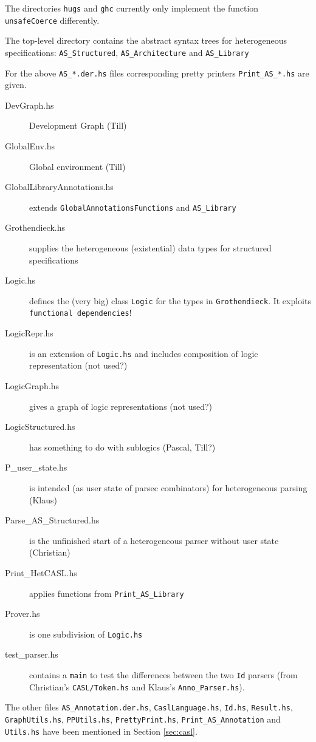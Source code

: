 \documentclass{article}
\begin{document}
The directories \texttt{hugs} and \texttt{ghc} currently only implement the function \texttt{unsafeCoerce} differently. 

The top-level directory contains the abstract syntax trees for
heterogeneous specifications: \texttt{AS\_Structured}, \texttt{AS\_Architecture} and \texttt{AS\_Library}

For the above \texttt{AS\_*.der.hs} files corresponding pretty
printers \texttt{Print\_AS\_*.hs} are given. 

\begin{description}
\item[DevGraph.hs] Development Graph (Till)
\item[GlobalEnv.hs] Global environment (Till)
\item[GlobalLibraryAnnotations.hs] extends \texttt{GlobalAnnotationsFunctions} and \texttt{AS\_Library}
\item[Grothendieck.hs] supplies the heterogeneous (existential) data
  types for structured specifications
\item[Logic.hs] defines the (very big) class \texttt{Logic} for the
  types in \texttt{Grothendieck}. It exploits \texttt{functional
    dependencies}!
\item[LogicRepr.hs] is an extension of \texttt{Logic.hs} and includes
  composition of logic representation (not used?)
\item[LogicGraph.hs] gives a graph of logic representations (not used?)
\item[LogicStructured.hs] has something to do with sublogics (Pascal, Till?)
\item[P\_user\_state.hs] is intended (as user state of parsec
  combinators) for heterogeneous parsing (Klaus)
\item[Parse\_AS\_Structured.hs] is the unfinished start of a heterogeneous
  parser without user state (Christian)
\item[Print\_HetCASL.hs] applies functions from \texttt{Print\_AS\_Library}
\item[Prover.hs] is one subdivision of \texttt{Logic.hs}
\item[test\_parser.hs] contains a \texttt{main} to test the differences
  between the two \texttt{Id} parsers (from Christian's
  \texttt{CASL/Token.hs} and Klaus's \texttt{Anno\_Parser.hs}).
\end{description}

The other files \texttt{AS\_Annotation.der.hs},
\texttt{CaslLanguage.hs}, \texttt{Id.hs}, \texttt{Result.hs},
\texttt{GraphUtils.hs}, \texttt{PPUtils.hs}, \texttt{PrettyPrint.hs},
\texttt{Print\_AS\_Annotation} and \texttt{Utils.hs} have been mentioned in 
Section \ref{sec:casl}.
\end{document}
